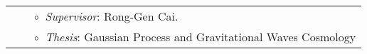 \documentclass[letterpaper]{moderncv}
\begin{document}
\vspace{0.2cm}
\vspace{-0.1cm}
\begin{tabular}{rcl}
&\hspace{0.4cm} &$\circ\;\;${\textit{Supervisor}}: Rong-Gen Cai.\\
&\hspace{0.4cm} &$\circ\;\;${\textit{Thesis}}: Gaussian Process and Gravitational Waves Cosmology
\end{tabular}



\end{document}
